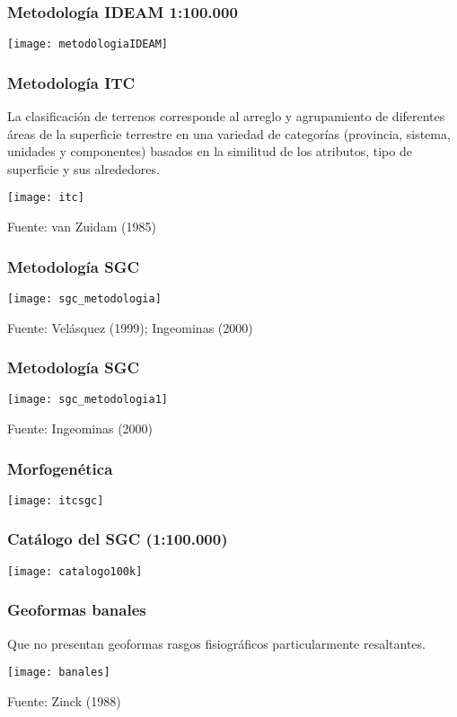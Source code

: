 \documentclass{beamer}
\begin{document}
\begin{frame}
\frametitle{Metodología IDEAM 1:100.000}
\begin{center}
	\texttt{[image: metodologiaIDEAM]}
\end{center}
\end{frame}
\begin{frame}
\frametitle{Metodología ITC}
\justifying
\small{La clasificación de terrenos corresponde al arreglo y agrupamiento de diferentes áreas de la superficie terrestre en una variedad de categorías (provincia, sistema, unidades y componentes) basados en la similitud de los atributos,  tipo de superficie y sus alrededores.
}
\begin{center}
	\texttt{[image: itc]}
\end{center}
\tiny{Fuente: van Zuidam (1985)}
\end{frame}
\begin{frame}
\frametitle{Metodología SGC}
\begin{center}
	\texttt{[image: sgc\_metodologia]}
\end{center}
\tiny{Fuente: Velásquez (1999); Ingeominas (2000)}
\end{frame}
\begin{frame}
\frametitle{Metodología SGC}
\begin{center}
	\texttt{[image: sgc\_metodologia1]}
\end{center}
\tiny{Fuente: Ingeominas (2000)}
\end{frame}
\begin{frame}
\frametitle{Morfogenética}
\begin{center}
	\texttt{[image: itcsgc]}
\end{center}
\end{frame}
\begin{frame}
\frametitle{Catálogo del SGC (1:100.000)}
\begin{center}
	\texttt{[image: catalogo100k]}
\end{center}
\end{frame}
\begin{frame}
\frametitle{Geoformas banales}
\small{Que no presentan geoformas rasgos fisiográficos particularmente resaltantes. }
\begin{center}
	\texttt{[image: banales]}
\end{center}
\tiny{Fuente: Zinck (1988)}
\end{frame}
\end{document}
